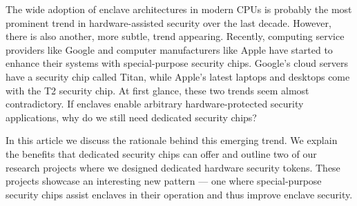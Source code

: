 The wide adoption of enclave architectures in modern CPUs is probably the most prominent trend in hardware-assisted security over the last decade. However, there is also another, more subtle, trend appearing. Recently, computing service providers like Google and computer manufacturers like Apple have started to enhance their systems with special-purpose security chips. Google's cloud servers have a security chip called Titan, while Apple's latest laptops and desktops come with the T2 security chip. At first glance, these two trends seem almost contradictory. If enclaves enable arbitrary hardware-protected security applications, why do we still need dedicated security chips? 

In this article we discuss the rationale behind this emerging trend. We explain the benefits that dedicated security chips can offer and outline two of our research projects where we designed dedicated hardware security tokens. These projects showcase an interesting new pattern --- one where special-purpose security chips assist enclaves in their operation and thus improve enclave security. 
